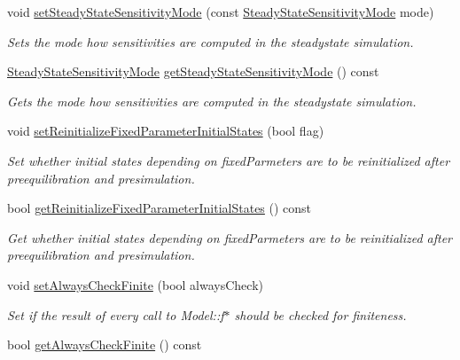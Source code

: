 \begin{DoxyCompactItemize}
void \mbox{\hyperlink{classamici_1_1_model_ab8e08cf804357e3ac070c11ac9b8ec35}{set\+Steady\+State\+Sensitivity\+Mode}} (const \mbox{\hyperlink{namespaceamici_a1f7d44f04185d57423d01d47d13470a6}{Steady\+State\+Sensitivity\+Mode}} mode)
\begin{DoxyCompactList}\small\item\em Sets the mode how sensitivities are computed in the steadystate simulation. \end{DoxyCompactList}\item 
\mbox{\hyperlink{namespaceamici_a1f7d44f04185d57423d01d47d13470a6}{Steady\+State\+Sensitivity\+Mode}} \mbox{\hyperlink{classamici_1_1_model_abe272de7f41f621d27d169f7918ecac3}{get\+Steady\+State\+Sensitivity\+Mode}} () const
\begin{DoxyCompactList}\small\item\em Gets the mode how sensitivities are computed in the steadystate simulation. \end{DoxyCompactList}\item 
void \mbox{\hyperlink{classamici_1_1_model_aaf26e3d4c8b574bc7e63f8beea677bcb}{set\+Reinitialize\+Fixed\+Parameter\+Initial\+States}} (bool flag)
\begin{DoxyCompactList}\small\item\em Set whether initial states depending on fixed\+Parmeters are to be reinitialized after preequilibration and presimulation. \end{DoxyCompactList}\item 
bool \mbox{\hyperlink{classamici_1_1_model_a09f372616ff7bf8073c732801b666f7e}{get\+Reinitialize\+Fixed\+Parameter\+Initial\+States}} () const
\begin{DoxyCompactList}\small\item\em Get whether initial states depending on fixed\+Parmeters are to be reinitialized after preequilibration and presimulation. \end{DoxyCompactList}\item 
void \mbox{\hyperlink{classamici_1_1_model_ae183370edb2ee04786aba8eb25c805f4}{set\+Always\+Check\+Finite}} (bool always\+Check)
\begin{DoxyCompactList}\small\item\em Set if the result of every call to Model\+::f$\ast$ should be checked for finiteness. \end{DoxyCompactList}\item 
bool \mbox{\hyperlink{classamici_1_1_model_a1e6f9f243cc9ebbc5eb759b7fc949e88}{get\+Always\+Check\+Finite}} () const

\end{DoxyCompactItemize}
